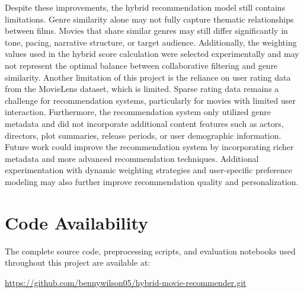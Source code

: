 \documentclass{article}
\begin{document}
Despite these improvements, the hybrid recommendation model still contains limitations. Genre similarity alone may not fully capture thematic relationships between films. Movies that share similar genres may still differ significantly in tone, pacing, narrative structure, or target audience. Additionally, the weighting values used in the hybrid score calculation were selected experimentally and may not represent the optimal balance between collaborative filtering and genre similarity. Another limitation of this project is the reliance on user rating data from the MovieLens dataset, which is limited. Sparse rating data remains a challenge for recommendation systems, particularly for movies with limited user interaction. Furthermore, the recommendation system only utilized genre metadata and did not incorporate additional content features such as actors, directors, plot summaries, release periods, or user demographic information. Future work could improve the recommendation system by incorporating richer metadata and more advanced recommendation techniques. Additional experimentation with dynamic weighting strategies and user-specific preference modeling may also further improve recommendation quality and personalization.

\section{Code Availability}

The complete source code, preprocessing scripts, and evaluation notebooks used throughout this project are available at:

\href{https://github.com/bennywilson05/hybrid-movie-recommender.git}{https://github.com/bennywilson05/hybrid-movie-recommender.git}

\newpage


\end{document}

